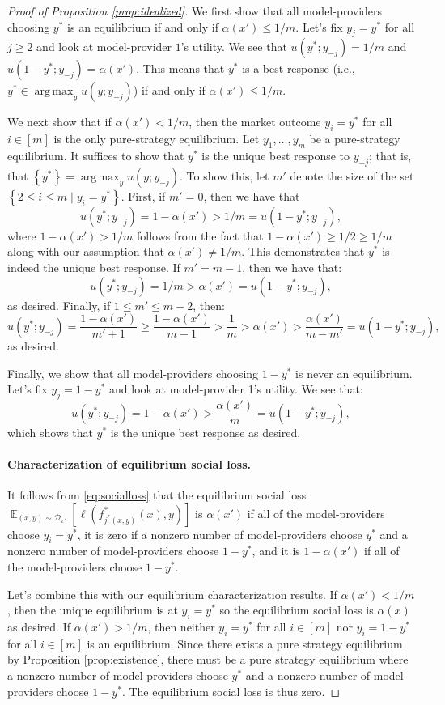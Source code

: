 \documentclass[letterpaper,11pt]{article}
\theoremstyle{plain}
\DeclareMathOperator*{\argmax}{arg\,max}
\DeclareMathOperator*{\E}{\mathbb{E}}
\begin{document}
\begin{proof}[Proof of Proposition \ref{prop:idealized}]
We first show that all model-providers choosing $y^*$ is an equilibrium if and only if $\alpha(x') \le 1/m$. Let's fix $y_j = y^*$ for all $j \ge 2$ and look at model-provider $1$'s utility. We see that $u(y^*; y_{-j}) = 1/m$ and $u(1-y^*; y_{-j}) = \alpha(x')$. This means that $y^*$ is a best-response (i.e., $y^* \in \argmax_y u(y; y_{-j})$) if and only if $\alpha(x') \le 1/m$. 

We next show that if $\alpha(x') < 1/m$, then the market outcome $y_i = y^*$ for all $i \in [m]$ is the only pure-strategy equilibrium. Let $y_1, \ldots, y_m$ be a pure-strategy equilibrium. It suffices to show that $y^*$ is the unique best response to $y_{-j}$; that is, that $\left\{y^*\right\} = \argmax_y u(y; y_{-j})$. To show this, let $m'$ denote the size of the set $\left\{2 \le i \le m \mid y_i = y^*\right\}$. First, if $m' = 0$, then we have that
\[u(y^*; y_{-j}) = 1 - \alpha(x') > 1/m = u(1 - y^*; y_{-j}),  \]
where $1- \alpha(x') > 1/m$ follows from the fact that $1 - \alpha(x') \ge 1/2 \ge 1/m$ along with our assumption that $\alpha(x') \neq 1/m$. This demonstrates that $y^*$ is indeed the unique best response. If $m' = m -1$, then we have that:
\[u(y^*; y_{-j}) = 1/m > \alpha(x') = u(1 - y^*; y_{-j}),  \] as desired. Finally, if $1 \le m' \le m-2$, then:
\[ u(y^*; y_{-j}) = \frac{1-\alpha(x')}{m' + 1} \ge \frac{1-\alpha(x')}{m-1} > \frac{1}{m} > \alpha(x') > \frac{\alpha(x')}{m - m'} = u(1-y^*; y_{-j}), \]
as desired. 

Finally, we show that all model-providers choosing $1-y^*$ is never an equilibrium. Let's fix $y_j = 1 - y^*$ and look at model-provider 1's utility. We see that:
\[ u(y^*; y_{-j}) = 1 - \alpha(x') > \frac{ \alpha(x')}{m} =u(1-y^*; y_{-j}), \]
which shows that $y^*$ is the unique best response as desired.


\paragraph{Characterization of equilibrium social loss.} It follows from \eqref{eq:socialloss} that the equilibrium social loss $\E_{(x,y) \sim \mathcal{D}_{x'}}[\ell(f^*_{j^*(x,y)}(x), y)]$ is $\alpha(x')$ if all of the model-providers choose $y_i = y^*$, it is zero if a nonzero number of model-providers choose $y^*$ and a nonzero number of model-providers choose $1-y^*$, and it is $1-\alpha(x')$ if all of the model-providers choose $1- y^*$.

Let's combine this with our equilibrium characterization results. If $\alpha(x') < 1/m$, then the unique equilibrium is at $y_i = y^*$ so the equilibrium social loss is $\alpha(x)$ as desired. If $\alpha(x') > 1/m$, then neither $y_i = y^*$ for all $i \in [m]$ nor $y_i = 1- y^*$ for all $i \in [m]$ is an equilibrium. Since there exists a pure strategy equilibrium by Proposition \ref{prop:existence}, there must be a pure strategy equilibrium where a nonzero number of model-providers choose $y^*$ and a nonzero number of model-providers choose $1-y^*$. The equilibrium social loss is thus zero. 


\end{proof}
\end{document}
